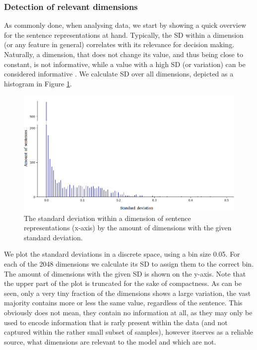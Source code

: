 \subsubsection{Detection of relevant dimensions}
As commonly done, when analysing data, we start by showing a quick overview for the sentence representations at hand. Typically, the \ac{SD} within a dimension (or any feature in general) correlates with its relevance for decision making. Naturally, a dimension, that does not change its value, and thus being close to constant, is not informative, while a value with a high \ac{SD} (or variation) can be considered informative \citep{Bishop2007}. We calculate \ac{SD} over all dimensions, depicted as a histogram in Figure \ref{fig:sd}.
\begin{figure}[tph!]
\centering
	\includegraphics[totalheight=8cm]{fig/sd.png}
	\caption{The standard deviation within a dimension of sentence representations (x-axis) by the amount of dimensions with the given standard deviation.}
	\label{fig:sd}
\end{figure}
We plot the standard deviations in a discrete space, using a bin size 0.05. For each of the 2048 dimensions we calculate its \ac{SD} to assign them to the correct bin. The amount of dimensions with the given \ac{SD} is shown on the y-axis. Note that the upper part of the plot is truncated for the sake of compactness. As can be seen, only a very tiny fraction of the dimensions shows a large variation, the vast majority contains more or less the same value, regardless of the sentence. This obviously does not mean, they contain no information at all, as they may only be used to encode information that is rarly present within the data (and not captured within the rather small subset of samples), however itserves as a reliable source, what dimensions are relevant to the model and which are not.


